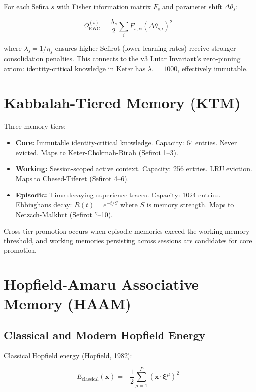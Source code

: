 \documentclass[11pt]{article}
\theoremstyle{plain}
\begin{document}
For each Sefira \( s \) with Fisher information matrix \( F_s \) and parameter shift \( \Delta\theta_s \):

\begin{equation}
\Omega_{\text{EWC}}^{(s)} = \frac{\lambda_s}{2} \sum_i F_{s,ii} (\Delta\theta_{s,i})^2
\end{equation}

where \( \lambda_s = 1/\eta_s \) ensures higher Sefirot (lower learning rates) receive stronger consolidation penalties. This connects to the v3 Lutar Invariant's zero-pinning axiom: identity-critical knowledge in Keter has \( \lambda_1 = 1000 \), effectively immutable.


\section{Kabbalah-Tiered Memory (KTM)}

Three memory tiers:

\begin{itemize}
  \item \textbf{Core:} Immutable identity-critical knowledge. Capacity: 64 entries. Never evicted. Maps to Keter-Chokmah-Binah (Sefirot 1–3).
  \item \textbf{Working:} Session-scoped active context. Capacity: 256 entries. LRU eviction. Maps to Chesed-Tiferet (Sefirot 4–6).
  \item \textbf{Episodic:} Time-decaying experience traces. Capacity: 1024 entries. Ebbinghaus decay: \( R(t) = e^{-t/S} \) where \( S \) is memory strength. Maps to Netzach-Malkhut (Sefirot 7–10).
\end{itemize}

Cross-tier promotion occurs when episodic memories exceed the working-memory threshold, and working memories persisting across sessions are candidates for core promotion.


\section{Hopfield-Amaru Associative Memory (HAAM)}

\subsection{Classical and Modern Hopfield Energy}

Classical Hopfield energy (Hopfield, 1982):

\begin{equation}
E_{\text{classical}}(\mathbf{x}) = -\frac{1}{2} \sum_{\mu=1}^{P} (\mathbf{x} \cdot \boldsymbol{\xi}^\mu)^2
\end{equation}
\end{document}
